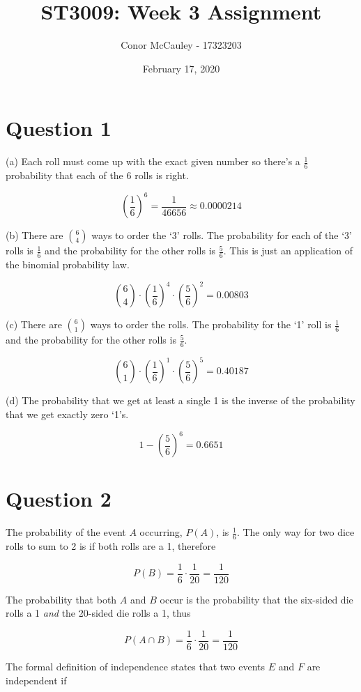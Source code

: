 \documentclass[12pt]{article}
\title{ST3009: Week 3 Assignment}
\author{Conor McCauley - 17323203}
\date{February 17, 2020}
\begin{document}
\maketitle

\section*{Question 1}

\noindent (a) Each roll must come up with the exact given number so there's a $\frac{1}{6}$ probability that each of the $6$ rolls is right.

$$ \left( \frac{1}{6} \right)^6 = \frac{1}{46656} \approx 0.0000214 $$

\noindent (b) There are ${6 \choose 4}$ ways to order the `3' rolls. The probability for each of the `3' rolls is $\frac{1}{6}$ and the probability for the other rolls is $\frac{5}{6}$. This is just an application of the binomial probability law.

$$ {6 \choose 4} \cdot \left( \frac{1}{6} \right)^4 \cdot \left( \frac{5}{6} \right)^2 = 0.00803 $$

\noindent (c) There are ${6 \choose 1}$ ways to order the rolls. The probability for the `1' roll is $\frac{1}{6}$ and the probability for the other rolls is $\frac{5}{6}$.

$$ {6 \choose 1} \cdot \left( \frac{1}{6} \right)^1 \cdot \left( \frac{5}{6} \right)^5 = 0.40187 $$

\noindent (d) The probability that we get at least a single 1 is the inverse of the probability that we get exactly zero `1's.
    
$$ 1 - \left( \frac{5}{6} \right)^6 = 0.6651 $$

\section*{Question 2}

\noindent The probability of the event $A$ occurring, $P(A)$, is $\frac{1}{6}$. The only way for two dice rolls to sum to 2 is if both rolls are a 1, therefore

$$ P(B) = \frac{1}{6} \cdot \frac{1}{20} = \frac{1}{120} $$

\indent The probability that both $A$ and $B$ occur is the probability that the six-sided die rolls a 1 {\it and} the 20-sided die rolls a 1, thus

$$ P(A \cap B) = \frac{1}{6} \cdot \frac{1}{20} = \frac{1}{120} $$

\indent The formal definition of independence states that two events $E$ and $F$ are independent if
\end{document}
